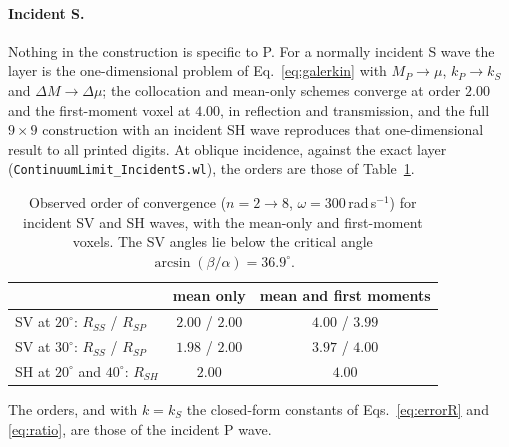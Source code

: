 \documentclass[11pt,a4paper]{article}
\newcommand{\nb}[1]{\texttt{#1}}
\begin{document}
\paragraph{Incident S.} Nothing in the construction is specific to P. For a normally incident S wave
the layer is the one-dimensional problem of Eq.~\eqref{eq:galerkin} with $M_P\to\mu$, $k_P\to k_S$ and
$\Delta M\to\Delta\mu$; the collocation and mean-only schemes converge at order $2.00$ and the
first-moment voxel at $4.00$, in reflection and transmission, and the full $9\times9$ construction
with an incident SH wave reproduces that one-dimensional result to all printed digits. At oblique
incidence, against the exact layer (\nb{ContinuumLimit\_IncidentS.wl}), the orders are those of
Table~\ref{tab:incS}.
\begin{table}[htbp]
\centering
\caption{Observed order of convergence ($n=2\to8$, $\omega=300$\,rad\,s$^{-1}$) for incident SV and SH waves, with the mean-only and first-moment voxels. The SV angles lie below the critical angle $\arcsin(\beta/\alpha)=36.9^\circ$.}\label{tab:incS}
\small
\begin{tabular}{@{}lcc@{}}
\toprule
 & mean only & mean and first moments \\
\midrule
SV at $20^\circ$: $R_{SS}$ / $R_{SP}$ & $2.00$ / $2.00$ & $4.00$ / $3.99$ \\
SV at $30^\circ$: $R_{SS}$ / $R_{SP}$ & $1.98$ / $2.00$ & $3.97$ / $4.00$ \\
SH at $20^\circ$ and $40^\circ$: $R_{SH}$ & $2.00$ & $4.00$ \\
\bottomrule
\end{tabular}
\end{table}
The orders, and with $k=k_S$ the closed-form constants of
Eqs.~\eqref{eq:errorR} and \eqref{eq:ratio}, are those of the incident P wave.
\end{document}
